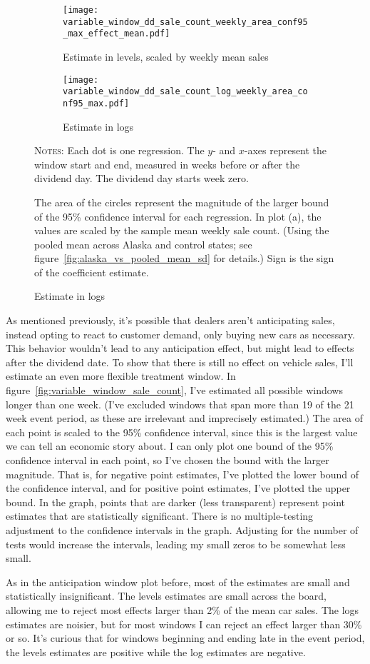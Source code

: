 \documentclass[11pt,letterpaper,oneside]{article}
\newcommand{\varWindowDDnotes}{%
Each dot is one regression.
The $y$- and $x$-axes represent the window start and end, measured in weeks before or after the dividend day.
The dividend day starts week zero.

 The area of the circles represent the magnitude of the larger bound of the 95\% confidence interval for each regression.
In plot (a), the values are scaled by the sample mean weekly sale count.
(Using the pooled mean across Alaska and control states; see figure~\ref{fig:alaska_vs_pooled_mean_sd} for details.)
Sign is the sign of the coefficient estimate. %
}
\begin{document}
\begin{doublespacing}
\begin{figure}[!hbtp]
    \caption{Sales count effects with varying windows ($\alpha_2$ and $\beta_2$)}
    \label{fig:variable_window_sale_count}
    \begin{subfigure}{0.97\linewidth}
        \caption{Estimate in levels, scaled by weekly mean sales}
        \centering
        \texttt{[image: variable\_window\_dd\_sale\_count\_weekly\_area\_conf95\_max\_effect\_mean.pdf]}
    \end{subfigure}
    \begin{subfigure}{0.97\linewidth}
        \caption{Estimate in logs}
        \texttt{[image: variable\_window\_dd\_sale\_count\_log\_weekly\_area\_conf95\_max.pdf]}
    \end{subfigure}

    {\footnotesize
    \textsc{Notes:}
    \varWindowDDnotes
    }
\end{figure}

As mentioned previously, it's possible that dealers aren't anticipating sales, instead opting to react to customer demand, only buying new cars as necessary.
This behavior wouldn't lead to any anticipation effect, but might lead to effects after the dividend date.
To show that there is still no effect on vehicle sales, I'll estimate an even more flexible treatment window.
In figure~\ref{fig:variable_window_sale_count}, I've estimated all possible windows longer than one week.
(I've excluded windows that span more than 19 of the 21 week event period, as these are irrelevant and imprecisely estimated.)
The area of each point is scaled to the 95\% confidence interval, since this is the largest value we can tell an economic story about.
I can only plot one bound of the 95\% confidence interval in each point, so I've chosen the bound with the larger magnitude.
That is, for negative point estimates, I've plotted the lower bound of the confidence interval, and for positive point estimates, I've plotted the upper bound.
In the graph, points that are darker (less transparent) represent point estimates that are statistically significant.
There is no multiple\hyp{}testing adjustment to the confidence intervals in the graph.
Adjusting for the number of tests would increase the intervals, leading my small zeros to be somewhat less small.

As in the anticipation window plot before, most of the estimates are small and statistically insignificant.
The levels estimates are small across the board, allowing me to reject most effects larger than 2\% of the mean car sales.
The logs estimates are noisier, but for most windows I can reject an effect larger than 30\% or so.
It's curious that for windows beginning and ending late in the event period, the levels estimates are positive while the log estimates are negative.


\end{doublespacing}
\end{document}
